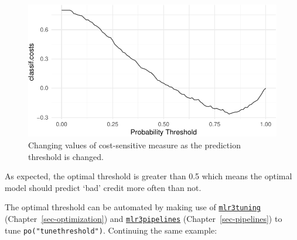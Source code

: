 \begin{Shaded}
\begin{Highlighting}[]
\OtherTok{=} \NormalTok{(}\NormalTok{,}
   \NormalTok{)}\SpecialCharTok{$}\SpecialCharTok{$}
 \NormalTok{, }
\end{Highlighting}
\end{Shaded}

\begin{figure}

{\centering \includegraphics[width=1\textwidth,height=\textheight]{chapters/chapter13/beyond_regression_and_classification_files/figure-pdf/fig-costsens-threshold-1.pdf}

}

\caption{\label{fig-costsens-threshold}Changing values of cost-sensitive
measure as the prediction threshold is changed.}

\end{figure}

As expected, the optimal threshold is greater than 0.5 which means the
optimal model should predict `bad' credit more often than not.

The optimal threshold can be automated by making use of
\href{https://mlr3tuning.mlr-org.com}{\texttt{mlr3tuning}}
(Chapter~\ref{sec-optimization}) and
\href{https://mlr3pipelines.mlr-org.com}{\texttt{mlr3pipelines}}
(Chapter~\ref{sec-pipelines}) to tune \texttt{po("tunethreshold")}.
Continuing the same example:

